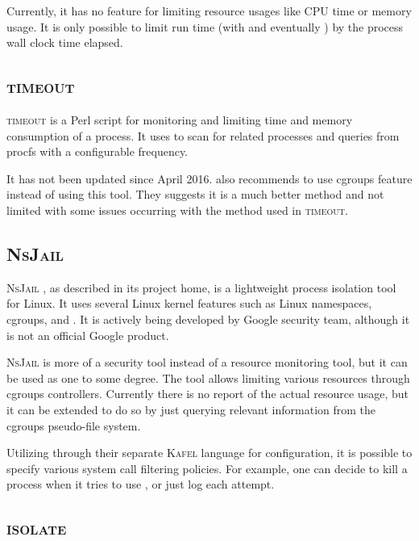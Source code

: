 Currently, it has no feature for limiting resource usages like CPU time or memory usage.
It is only possible to limit run time (with  and eventually ) by the process wall clock time elapsed.


\subsection{\textsc{timeout}}

\textsc{timeout} \citep{shvedScriptMeasureLimit2019} is a Perl script for monitoring and limiting time and memory consumption of a process.
It uses  \citep[ps(1)]{manpages} to scan for related processes and queries from procfs with a configurable frequency.

It has not been updated since April 2016.
\citeauthor{shvedScriptMeasureLimit2019} also recommends to use cgroups feature instead of using this tool.
They suggests it is a much better method and not limited with some issues occurring with the method used in \textsc{timeout}.

\subsection{\textsc{NsJail}}
\label{sec:resource.impl.nsjail}

\textsc{NsJail} \citep{LightweightProcessIsolation2019}, as described in its project home, is a lightweight process isolation tool for Linux.
It uses several Linux kernel features such as Linux namespaces, cgroups, and .
It is actively being developed by Google security team, although it is not an official Google product.

\textsc{NsJail} is more of a security tool instead of a resource monitoring tool, but it can be used as one to some degree.
The tool allows limiting various resources through cgroups controllers.
Currently there is no report of the actual resource usage, but it can be extended to do so by just querying relevant information from the cgroups pseudo-file system.

Utilizing  through their separate \textsc{Kafel} \citep{LanguageLibrarySpecifying2019} language for configuration, it is possible to specify various system call filtering policies.
For example, one can decide to kill a process when it tries to use , or just log each attempt.


\subsection{\textsc{isolate}}

